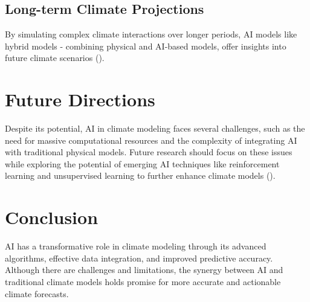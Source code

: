 \documentclass[12pt]{article}
\begin{document}
\subsection{Long-term Climate Projections}
By simulating complex climate interactions over longer periods, AI models like hybrid models - combining physical and AI-based models, offer insights into future climate scenarios (\cite{rasp2020combined}).

\section{Future Directions}
Despite its potential, AI in climate modeling faces several challenges, such as the need for massive computational resources and the complexity of integrating AI with traditional physical models. Future research should focus on these issues while exploring the potential of emerging AI techniques like reinforcement learning and unsupervised learning to further enhance climate models (\cite{nguyen2021deep}).

\section{Conclusion}
AI has a transformative role in climate modeling through its advanced algorithms, effective data integration, and improved predictive accuracy. Although there are challenges and limitations, the synergy between AI and traditional climate models holds promise for more accurate and actionable climate forecasts.



\end{document}
